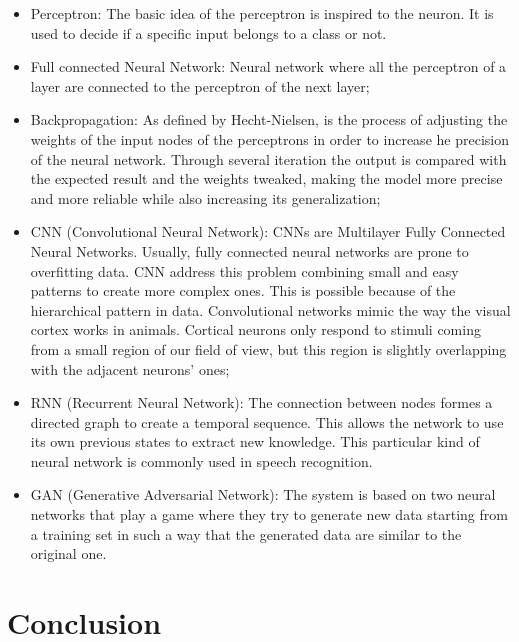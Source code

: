 \documentclass[conference]{IEEEtran}
\begin{document}
	\begin{itemize}

		\item Perceptron: The basic idea of the perceptron is inspired to the neuron. It is used to decide if a specific input belongs to a class or not. \cite{f7}

		\item Full connected Neural Network: Neural network where all the perceptron of a layer are connected to the perceptron of the next layer;

		\item Backpropagation: As defined by Hecht-Nielsen\cite{f8}, is the process of adjusting the weights of the input nodes of the perceptrons in order to increase he precision of the neural network. Through several iteration the output is compared with the expected result and the weights tweaked, making the model more precise and more reliable while also increasing its generalization;

		\item CNN (Convolutional Neural Network): CNNs are Multilayer Fully Connected Neural Networks. Usually, fully connected neural networks are prone to overfitting data. CNN address this problem combining small and easy patterns to create more complex ones. This is possible because of the hierarchical pattern in data.
		Convolutional networks mimic the way the visual cortex works in animals. Cortical neurons only respond to stimuli coming from a small region of our field of view, but this region is slightly overlapping with the adjacent neurons' ones; \cite{f9}

		\item RNN (Recurrent Neural Network): The connection between nodes formes a directed graph to create a temporal sequence. This allows the network to use its own previous states to extract new knowledge. This particular kind of neural network is commonly used in speech recognition. \cite{f10}

		\item GAN (Generative Adversarial Network): The system is based on two neural networks that play a game where they try to generate new data starting from a training set in such a way that the generated data are similar to the original one. \cite{f11}

	\end{itemize}


\section{Conclusion}
\end{document}
